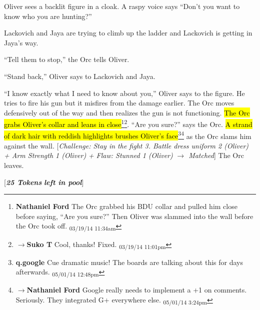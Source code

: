 Oliver sees a backlit figure in a cloak.  A raspy voice says ``Don't you want to know who you are hunting?''



Lackovich and Jaya are trying to climb up the ladder and Lackovich is getting in Jaya's way.  



``Tell them to stop,'' the Orc tells Oliver.

``Stand back,'' Oliver says to Lackovich and Jaya.



``I know exactly what I need to know about you,'' Oliver says to the figure.  He tries to fire his gun but it misfires from the damage earlier.   The Orc moves defensively out of the way and then realizes the gun is not functioning.  \hl{The Orc grabs Oliver's collar and leans in close}\footnote{\textbf{Nathaniel Ford }The Orc grabbed his BDU collar and pulled him close before saying, ``Are you sure?'' Then Oliver was slammed into the wall before the Orc took off. \textsubscript{03/19/14 11:34am}}\footnote{$\rightarrow$\textbf{Suko T }Cool, thanks!  Fixed. \textsubscript{03/19/14 11:01pm}}.  ``Are you sure?'' says the Orc.  \hl{A strand of dark hair with reddish highlights brushes Oliver's face}\footnote{\textbf{q.google }Cue dramatic music!  The boards are talking about this for days afterwards. \textsubscript{05/01/14 12:48pm}}\footnote{$\rightarrow$\textbf{Nathaniel Ford }Google really needs to implement a +1 on comments. Seriously. They integrated G+ everywhere else. \textsubscript{05/01/14 3:24pm}} as the Orc slams him against the wall.  {[}\textit{Challenge: Stay in the fight 3.  Battle dress uniform 2 (Oliver) + Arm Strength 1 (Oliver) + }\textit{ {\color[RGB]{255,0,0}Flaw: Stunned 1 (Oliver)} }\textit{ $\rightarrow$ Matched}{]}  The Orc leaves.





{[}\textit{\textbf{25 Tokens}}\textit{\textbf{ left in pool}}{]}








